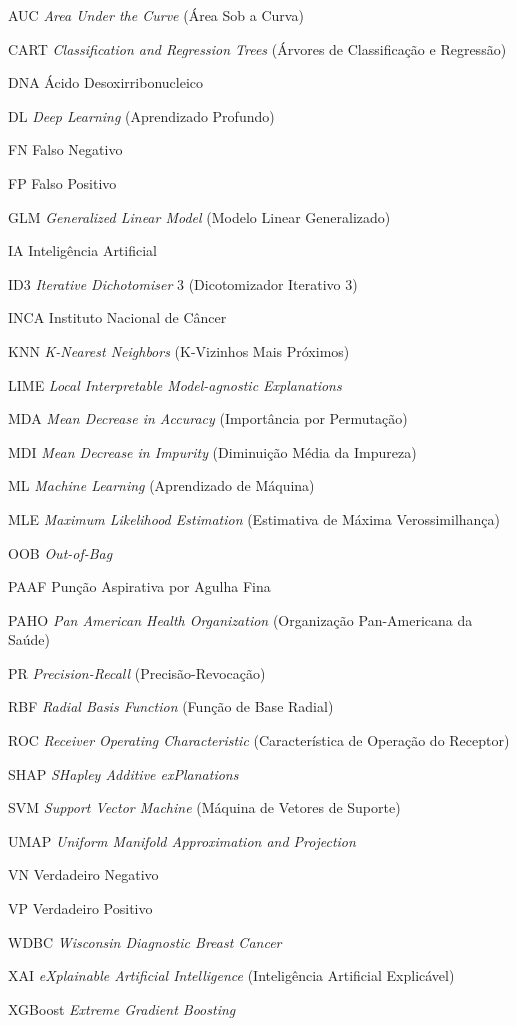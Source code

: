 \documentclass[
    12pt
    ,oneside
    ,a4paper
    ,chapter=TITLE
    ,section=TITLE
    ,sumario=abnt-6027-2012
    ,english,brazil]{abntex2} %
\begin{document}
\begin{siglas}
  \item[AUC] \textit{Area Under the Curve} (Área Sob a Curva)
  \item[CART] \textit{Classification and Regression Trees} (Árvores de Classificação e Regressão)
  \item[DNA] Ácido Desoxirribonucleico
  \item[DL] \textit{Deep Learning} (Aprendizado Profundo)
  \item[FN] Falso Negativo
  \item[FP] Falso Positivo
  \item[GLM] \textit{Generalized Linear Model} (Modelo Linear Generalizado)
  \item[IA] Inteligência Artificial
  \item[ID3] \textit{Iterative Dichotomiser} 3 (Dicotomizador Iterativo 3)
  \item[INCA] Instituto Nacional de Câncer
  \item[KNN] \textit{K-Nearest Neighbors} (K-Vizinhos Mais Próximos)
  \item[LIME] \textit{Local Interpretable Model-agnostic Explanations}
  \item[MDA] \textit{Mean Decrease in Accuracy} (Importância por Permutação)
  \item[MDI] \textit{Mean Decrease in Impurity} (Diminuição Média da Impureza)
  \item[ML] \textit{Machine Learning} (Aprendizado de Máquina)
  \item[MLE] \textit{Maximum Likelihood Estimation} (Estimativa de Máxima Verossimilhança)
  \item[OOB] \textit{Out-of-Bag}
  \item[PAAF] Punção Aspirativa por Agulha Fina
  \item[PAHO] \textit{Pan American Health Organization} (Organização Pan-Americana da Saúde)
  \item[PR] \textit{Precision-Recall} (Precisão-Revocação)
  \item[RBF] \textit{Radial Basis Function} (Função de Base Radial)
  \item[ROC] \textit{Receiver Operating Characteristic} (Característica de Operação do Receptor)
  \item[SHAP] \textit{SHapley Additive exPlanations}
  \item[SVM] \textit{Support Vector Machine} (Máquina de Vetores de Suporte)
  \item[UMAP] \textit{Uniform Manifold Approximation and Projection}
  \item[VN] Verdadeiro Negativo
  \item[VP] Verdadeiro Positivo
  \item[WDBC] \textit{Wisconsin Diagnostic Breast Cancer}
  \item[XAI] \textit{eXplainable Artificial Intelligence} (Inteligência Artificial Explicável)
  \item[XGBoost] \textit{Extreme Gradient Boosting}
\end{siglas}
\end{document}
